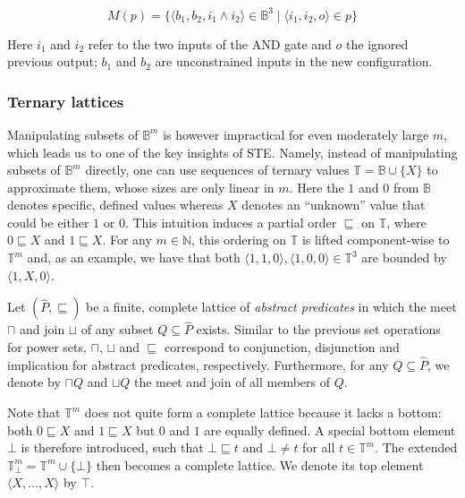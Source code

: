 \begin{equation*}
M(p) = \{ \langle b_{1}, b_{2}, i_{1} \wedge i_{2} \rangle \in \mathbb{B}^{3} \mid \langle i_{1}, i_{2}, o \rangle \in p \}
\end{equation*}

\noindent Here $i_{1}$ and $i_{2}$ refer to the two inputs of the AND gate and $o$ the ignored previous output; $b_{1}$ and $b_{2}$ are unconstrained inputs in the new configuration.

\subsubsection{Ternary lattices}

Manipulating subsets of $\mathbb{B}^{m}$ is however impractical for even moderately large $m$, which leads us to one of the key insights of STE. Namely, instead of manipulating subsets of $\mathbb{B}^{m}$ directly, one can use sequences of ternary values $\mathbb{T} = \mathbb{B} \cup \{ X \} $ to approximate them, whose sizes are only linear in $m$. Here the $1$ and $0$ from $\mathbb{B}$ denotes specific, defined values whereas $X$ denotes an ``unknown'' value that could be either $1$ or $0$. This intuition induces a partial order $\sqsubseteq$ on $\mathbb{T}$, where $0 \sqsubseteq X$ and $1 \sqsubseteq X$\footnotemark. For any $m \in \mathbb{N}$, this ordering on $\mathbb{T}$ is lifted component-wise to $\mathbb{T}^{m}$ and, as an example, we have that both $\langle 1,1,0 \rangle, \langle 1,0,0 \rangle \in \mathbb{T}^{3}$ are bounded by $\langle 1,X,0 \rangle$.



Let $(\hat P,\sqsubseteq)$ be a finite, complete lattice of \textit{abstract predicates} in which the meet $\sqcap$ and join $\sqcup$ of any subset $Q \subseteq \hat P$ exists. Similar to the previous set operations for power sets, $\sqcap$, $\sqcup$ and $\sqsubseteq$ correspond to conjunction, disjunction and implication for abstract predicates, respectively. Furthermore, for any $Q \subseteq \hat P$, we denote by $\sqcap Q$ and $\sqcup Q$ the meet and join of all members of $Q$. 

Note that $\mathbb{T}^{m}$ does not quite form a complete lattice because it lacks a bottom: both $0 \sqsubseteq X$ and $1 \sqsubseteq X$ but $0$ and $1$ are equally defined. A special bottom element $\bot$ is therefore introduced, such that $\bot \sqsubseteq t$ and $\bot \neq t$ for all $t \in \mathbb{T}^{m}$. The extended $\mathbb{T}_{\bot}^{m} = \mathbb{T}^{m} \cup \{ \bot \}$ then becomes a complete lattice. We denote its top element $\langle X, \dots, X \rangle$ by $\top$.

